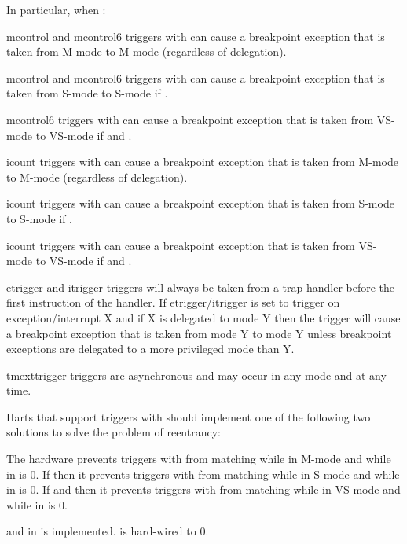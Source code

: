 \begin{commentary}
\begin{steps}{In particular, when :}
\item mcontrol and mcontrol6 triggers with  can cause a
breakpoint exception that is taken from M-mode to M-mode (regardless of
delegation).
\item mcontrol and mcontrol6 triggers with  can cause a
breakpoint exception that is taken from S-mode to S-mode if .
\item mcontrol6 triggers with  can cause a
breakpoint exception that is taken from VS-mode to VS-mode if 
and .
\item icount triggers with  can cause a
breakpoint exception that is taken from M-mode to M-mode (regardless of
delegation).
\item icount triggers with  can cause a
breakpoint exception that is taken from S-mode to S-mode if .
\item icount triggers with  can cause a
breakpoint exception that is taken from VS-mode to VS-mode if 
and .
\item etrigger and itrigger triggers will always be taken from a trap handler
before the first instruction of the handler.  If etrigger/itrigger is set to
trigger on exception/interrupt X and if X is delegated to mode Y then the
trigger will cause a breakpoint exception that is taken from mode Y to mode
Y unless breakpoint exceptions are delegated to a more privileged mode than Y.
\item tmexttrigger triggers are asynchronous and may occur in any mode and
at any time.
\end{steps}
\end{commentary}

\begin{steps}{Harts that support triggers with 
should implement one of the following two solutions to solve the problem of
reentrancy:}
\item The hardware prevents triggers with  from
matching while in M-mode and while \FcsrMstatusMie in \Rmstatus is 0.  If
 then it prevents triggers with 
from matching while in S-mode and while \FcsrSstatusSie in \Rsstatus is 0.
If  and  then it prevents triggers with
 from matching while in VS-mode and while
\FcsrSstatusSie in \Rvsstatus is 0.
\item \FcsrTcontrolMte and \FcsrTcontrolMpte in \RcsrTcontrol is
implemented.  \Rmedeleg[3] is hard-wired to 0.
\end{steps}

